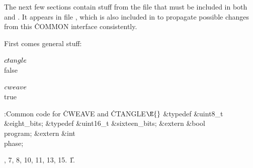 The next few sections contain stuff from the file  that
must
be included in both  and . It appears in
file , which is also included in  to
propagate
possible changes from this \.{COMMON} interface consistently.








First comes general stuff:



\Y\B\4\D$\\{ctangle}$ \5
\\{false}\par
\B\4\D$\\{cweave}$ \5
\\{true}\par
\Y\B\4:Common code for \.{CWEAVE} and \.{CTANGLE}\X${}\E{}$\6
\&{typedef} \&{uint8\_t} \&{eight\_bits};\6
\&{typedef} \&{uint16\_t} \&{sixteen\_bits};\6
\&{extern} \&{bool} \\{program};\6
\&{extern} \&{int} \\{phase};\par
{}, 7, 8, 10, 11, 13, 15.
\U1.\fi

